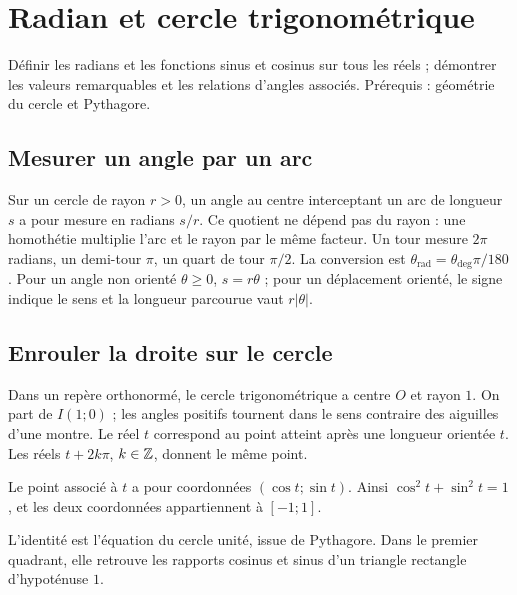 \documentclass[../cours_1re.tex]{subfiles}
\begin{document}
\setcounter{chapter}{13}
\chapter{Radian et cercle trigonométrique}
\label{ch:14}
\begin{objectif}
Définir les radians et les fonctions sinus et cosinus sur tous les réels ; démontrer les valeurs remarquables et les relations d'angles associés. Prérequis : géométrie du cercle et Pythagore.
\end{objectif}
\section{Mesurer un angle par un arc}
Sur un cercle de rayon $r>0$, un angle au centre interceptant un arc de longueur $s$ a pour mesure en radians $s/r$.
Ce quotient ne dépend pas du rayon : une homothétie multiplie l'arc et le rayon par le même facteur.
Un tour mesure $2\pi$ radians, un demi-tour $\pi$, un quart de tour $\pi/2$.
La conversion est $\theta_{\mathrm{rad}}=\theta_{\mathrm{deg}}\pi/180$.
Pour un angle non orienté $\theta\ge0$, $s=r\theta$ ; pour un déplacement orienté, le signe indique le sens et la longueur parcourue vaut $r|\theta|$.
\section{Enrouler la droite sur le cercle}
Dans un repère orthonormé, le cercle trigonométrique a centre $O$ et rayon $1$. On part de $I(1;0)$ ; les angles positifs tournent dans le sens contraire des aiguilles d'une montre.
Le réel $t$ correspond au point atteint après une longueur orientée $t$. Les réels $t+2k\pi$, $k\in\mathbb{Z}$, donnent le même point.
\begin{definition}
Le point associé à $t$ a pour coordonnées $(\cos t;\sin t)$.
Ainsi $\cos^2t+\sin^2t=1$, et les deux coordonnées appartiennent à $[-1;1]$.
\end{definition}
L'identité est l'équation du cercle unité, issue de Pythagore. Dans le premier quadrant, elle retrouve les rapports cosinus et sinus d'un triangle rectangle d'hypoténuse $1$.
\begin{center}\end{center}
\end{document}
